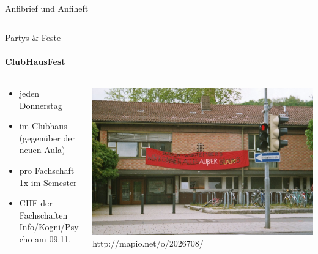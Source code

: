 \documentclass{beamer}
\begin{document}
\begin{frame}{Anfibrief und Anfiheft}
\begin{columns}
\begin{column}{.5\linewidth}
			\end{column}
		\end{columns}
	\end{frame}
			
	\begin{frame}{Partys \& Feste}
		\framesubtitle{ClubHausFest}
		\begin{columns}
			\begin{column}{.4\linewidth}
				\begin{itemize}
					\item jeden Donnerstag
					\item im Clubhaus (gegenüber der neuen Aula)
					\item pro Fachschaft 1x im Semester
					\item CHF der Fachschaften Info/Kogni/Psycho am 09.11.
				\end{itemize}
			\end{column}
			\begin{column}{.6\linewidth}
				\includegraphics[width=\linewidth]{pictures/clubhaus.jpg} \\
				\footnotesize http://mapio.net/o/2026708/
			\end{column}
		\end{columns}
	\end{frame}
\end{document}
